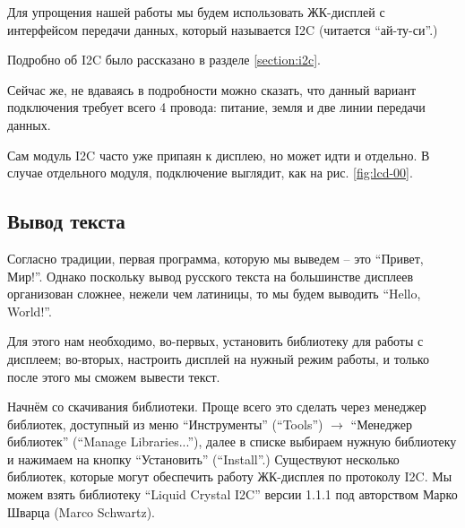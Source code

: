 \documentclass[../sparc.tex]{subfiles}
\begin{document}
Для упрощения нашей работы мы будем использовать ЖК-дисплей с интерфейсом
передачи данных, который называется \gls{I2C} (читается ``ай-ту-си''.)

Подробно об I2C было рассказано в разделе \ref{section:i2c}.

Сейчас же, не вдаваясь в подробности можно сказать, что данный вариант
подключения требует всего 4 провода: питание, земля и две линии передачи данных.

Сам модуль I2C часто уже припаян к дисплею, но может идти и отдельно.  В случае
отдельного модуля, подключение выглядит, как на рис. \ref{fig:lcd-00}.



\subsection{Вывод текста}



Согласно традиции, первая программа, которую мы выведем -- это ``Привет, Мир!''.
Однако поскольку вывод русского текста на большинстве дисплеев организован
сложнее, нежели чем латиницы, то мы будем выводить ``Hello, World!''.

Для этого нам необходимо, во-первых, установить библиотеку для работы с
дисплеем; во-вторых, настроить дисплей на нужный режим работы, и только после
этого мы сможем вывести текст.

Начнём со скачивания библиотеки.  Проще всего это сделать через менеджер
библиотек, доступный из меню ``Инструменты'' (``Tools'') $\rightarrow$ ``Менеджер
библиотек'' (``Manage Libraries...''), далее в списке выбираем нужную библиотеку
и нажимаем на кнопку ``Установить'' (``Install''.)  Существуют несколько
библиотек, которые могут обеспечить работу ЖК-дисплея по протоколу \gls{I2C}.
Мы можем взять библиотеку ``Liquid Crystal I2C'' версии 1.1.1 под авторством
Марко Шварца (Marco Schwartz).
\end{document}
